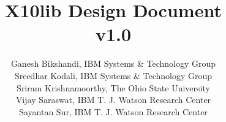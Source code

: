 \documentclass{article}
\def\Xtenlib{{\sf X10lib}}
\begin{document}
\title{\Xtenlib{} Design Document \\ v1.0}
\author{Ganesh Bikshandi, IBM Systems \& Technology Group\\
Sreedhar Kodali, IBM Systems \& Technology Group\\
Sriram Krishnamoorthy, The Ohio State University\\
Vijay Saraswat, IBM T. J. Watson Research Center\\
Sayantan Sur, IBM T. J. Watson Research Center}

\maketitle

\thispagestyle{fancy}








\end{document}
